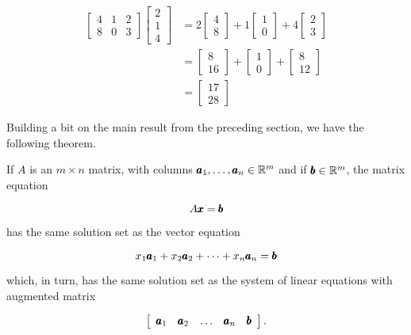 \begin{example}
    \[
\begin{aligned}
{\left[\begin{array}{lll}
4 & 1 & 2 \\
8 & 0 & 3
\end{array}\right]\left[\begin{array}{l}
2 \\
1 \\
4
\end{array}\right] } & =2\left[\begin{array}{l}
4 \\
8
\end{array}\right]+1\left[\begin{array}{l}
1 \\
0
\end{array}\right]+4\left[\begin{array}{l}
2 \\
3
\end{array}\right] \\
& =\left[\begin{array}{c}
8 \\
16
\end{array}\right]+\left[\begin{array}{l}
1 \\
0
\end{array}\right]+\left[\begin{array}{c}
8 \\
12
\end{array}\right] \\
& =\left[\begin{array}{l}
17 \\
28
\end{array}\right]
\end{aligned}
\]
\end{example}

Building a bit on the main result from the preceding section, we have the following theorem.

\newpage

\begin{theorem}
    If $A$ is an $m \times n$ matrix, with columns $\pmb{a}_1, \ldots, \pmb{a}_n \in \mathbb{R}^m$ and if $\pmb{b} \in \mathbb{R}^m$, the matrix equation

\[
A \pmb{x} = \pmb{b}
\]

has the same solution set as the vector equation

\[
x_1 \pmb{a}_1 + x_2 \pmb{a}_2 + \cdots + x_n \pmb{a}_n = \pmb{b}
\]

which, in turn, has the same solution set as the system of linear equations with augmented matrix

\[
\left[\begin{array}{lllll}
\pmb{a}_1 & \pmb{a}_2 & \ldots & \pmb{a}_n & \pmb{b}
\end{array}\right].
\]

\end{theorem}

